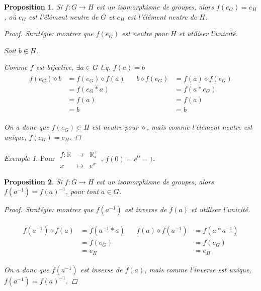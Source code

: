 \documentclass{report}
\newcommand*{\reels}{\mathbb{R}}
\newtheorem*{prop}{Proposition}
\theoremstyle{definition}
\theoremstyle{remark}
\newtheorem*{exem}{Exemple}
\begin{document}
	\begin{prop}
		Si $f:G \to H$ est un isomorphisme de groupes, alors $f(e_G)=e_H$, o\`u $e_G$ est l'\'el\'ement neutre de $G$ et $e_H$ est l'\'el\'ement neutre de $H$.
		\begin{proof}
			Strat\'egie: montrer que $f(e_G)$ est neutre pour $H$ et utiliser l'unicit\'e.

			Soit $b \in H$.

			Comme $f$ est bijective, $\exists a \in G$ t.q. $f(a)=b$
			\begin{align*}
				\begin{split}
					f(e_G) \diamond b&= f(e_G) \diamond f(a)\\
					&= f(e_G*a)\\
					&= f(a)\\
					&=b
				\end{split}
				&
				\begin{split}
					b \diamond f(e_G)&= f(a) \diamond f(e_G)\\
					&= f(a*e_G)\\
					&= f(a)\\
					&= b
				\end{split}
			\end{align*}

			On a donc que $f(e_G) \in H$ est neutre pour $\diamond$, mais comme l'\'el\'ement neutre est unique, $f(e_G)=e_H$.
		\end{proof}
	\end{prop}
	\begin{exem}
		Pour $\begin{array}{rcl}
			f:\reels&\to&\reels^+_*\\
			x&\mapsto&e^x
		\end{array}$, $f(0)=e^0=1$.
	\end{exem}
	\begin{prop}
		Si $f:G \to H$ est un isomorphisme de groupes, alors $f(a^{-1})=f(a)^{-1}$, pour tout $a \in G$.
		\begin{proof}
			Strat\'egie: montrer que $f(a^{-1})$ est inverse de $f(a)$ et utiliser l'unicit\'e.

			\begin{align*}
				\begin{split}
					f(a^{-1}) \diamond f(a)&= f(a^{-1}*a)\\
					&= f(e_G)\\
					&= e_H
				\end{split}
				&
				\begin{split}
					f(a) \diamond f(a^{-1})&= f(a*a^{-1})\\
					&= f(e_G)\\
					&= e_H
				\end{split}
			\end{align*}

			On a donc que $f(a^{-1})$ est inverse de $f(a)$, mais comme l'inverse est unique, $f(a^{-1})=f(a)^{-1}$.
		\end{proof}
	\end{prop}
\end{document}
